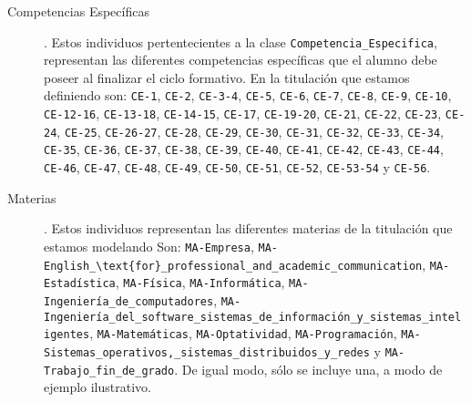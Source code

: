 \begin{description}
		\item [Competencias Específicas]. Estos individuos pertentecientes a la clase \lstinline!Competencia_Especifica!, representan las diferentes competencias específicas que el alumno debe poseer al finalizar el ciclo formativo. En la titulación que estamos definiendo son: \lstinline!CE-1!, \lstinline!CE-2!, \lstinline!CE-3-4!, \lstinline!CE-5!, \lstinline!CE-6!, \lstinline!CE-7!, \lstinline!CE-8!, \lstinline!CE-9!, \lstinline!CE-10!, \lstinline!CE-12-16!, \lstinline!CE-13-18!, \lstinline!CE-14-15!, \lstinline!CE-17!, \lstinline!CE-19-20!, \lstinline!CE-21!, \lstinline!CE-22!, \lstinline!CE-23!, \lstinline!CE-24!, \lstinline!CE-25!, \lstinline!CE-26-27!, \lstinline!CE-28!, \lstinline!CE-29!, \lstinline!CE-30!, \lstinline!CE-31!, \lstinline!CE-32!, \lstinline!CE-33!, \lstinline!CE-34!, \lstinline!CE-35!, \lstinline!CE-36!, \lstinline!CE-37!, \lstinline!CE-38!, \lstinline!CE-39!, \lstinline!CE-40!, \lstinline!CE-41!, \lstinline!CE-42!, \lstinline!CE-43!, \lstinline!CE-44!, \lstinline!CE-46!, \lstinline!CE-47!, \lstinline!CE-48!, \lstinline!CE-49!, \lstinline!CE-50!, \lstinline!CE-51!, \lstinline!CE-52!, \lstinline!CE-53-54! y \lstinline!CE-56!.
 		
		
 
 
		\item [Materias]. Estos individuos representan las diferentes materias de la titulación que estamos modelando Son: \lstinline!MA-Empresa!, \lstinline!MA-English_\text{for}_professional_and_academic_communication!, \lstinline!MA-Estadística!, \lstinline!MA-Física!, \lstinline!MA-Informática!, \lstinline!MA-Ingeniería_de_computadores!, \lstinline!MA-Ingeniería_del_software_sistemas_de_información_y_sistemas_inteligentes!, \lstinline!MA-Matemáticas!, \lstinline!MA-Optatividad!, \lstinline!MA-Programación!, \lstinline!MA-Sistemas_operativos,_sistemas_distribuidos_y_redes! y \lstinline!MA-Trabajo_fin_de_grado!. De igual modo, sólo se incluye una, a modo de ejemplo ilustrativo.
		 
	

\end{description}
